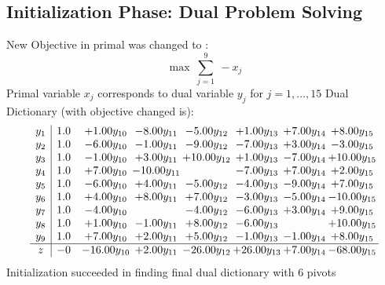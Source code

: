 \documentclass[9pt]{article}
\begin{document}
\subsection{Initialization Phase: Dual Problem Solving}
New Objective in primal was changed to : \[ \max\ \sum_{j=1}^{9}\ - x_j \] 
Primal variable $x_j$ corresponds to dual variable $y_j$ for $j = 1,\ldots,15$
Dual Dictionary (with objective changed is): 
\[\begin{array}{c| c c@{\hskip 2pt} c@{\hskip 2pt} c@{\hskip 2pt} c@{\hskip 2pt} c@{\hskip 2pt} c@{\hskip 2pt} }
 y_{1}   &  1.0 & +  1.00 y_{10} & -8.00 y_{11} & -5.00 y_{12} & +  1.00 y_{13} & +  7.00 y_{14} & +  8.00 y_{15}\\
 y_{2}   &  1.0 & -6.00 y_{10} & -1.00 y_{11} & -9.00 y_{12} & -7.00 y_{13} & +  3.00 y_{14} & -3.00 y_{15}\\
 y_{3}   &  1.0 & -1.00 y_{10} & +  3.00 y_{11} & + 10.00 y_{12} & +  1.00 y_{13} & -7.00 y_{14} & + 10.00 y_{15}\\
 y_{4}   &  1.0 & +  7.00 y_{10} & -10.00 y_{11} &   & -7.00 y_{13} & +  7.00 y_{14} & +  2.00 y_{15}\\
 y_{5}   &  1.0 & -6.00 y_{10} & +  4.00 y_{11} & -5.00 y_{12} & -4.00 y_{13} & -9.00 y_{14} & +  7.00 y_{15}\\
 y_{6}   &  1.0 & +  4.00 y_{10} & +  8.00 y_{11} & +  7.00 y_{12} & -3.00 y_{13} & -5.00 y_{14} & -10.00 y_{15}\\
 y_{7}   &  1.0 & -4.00 y_{10} &   & -4.00 y_{12} & -6.00 y_{13} & +  3.00 y_{14} & +  9.00 y_{15}\\
 y_{8}   &  1.0 & +  1.00 y_{10} & -1.00 y_{11} & +  8.00 y_{12} & -6.00 y_{13} &   & + 10.00 y_{15}\\
 y_{9}   &  1.0 & +  7.00 y_{10} & +  2.00 y_{11} & +  5.00 y_{12} & -1.00 y_{13} & -1.00 y_{14} & +  8.00 y_{15}\\
\hline
z    &  -0 & -16.00 y_{10} & +  2.00 y_{11} & -26.00 y_{12} & + 26.00 y_{13} & +  7.00 y_{14} & -68.00 y_{15}\\
\end{array}\]
Initialization succeeded in finding final dual dictionary with 6 pivots
\end{document}
